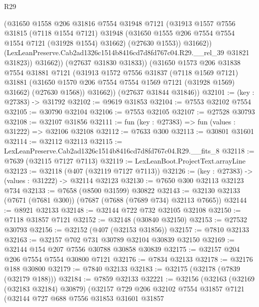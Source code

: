 \begin{lexlean}{R29}
\begin{coremodule}
                  (@31650
                    @1558
                    @206
                    @31816
                    @7554
                    @31948
                    @7121
                    (@31913
                      @1557
                      @7556
                      @31815
                      (@7118 @1554 @7121)
                      @31948
                      (@31650 @1555 @206 @7554 @7554 @1554 @7121 (@31928 @1554) @31662)
                      (@27630 @1553))
                    @31662))
                (LexLeanPreserve.Cab2ad1326c1514b8416cd7d8fd767c04.R29.__rel_39 @31821 @31823))
              @31662))
          (@27637 @31830 @31833))
        (@31650
          @1573
          @206
          @31838
          @7554
          @31881
          @7121
          (@31913
            @1572
            @7556
            @31837
            (@7118 @1569 @7121)
            @31881
            (@31650 @1570 @206 @7554 @7554 @1569 @7121 (@31928 @1569) @31662)
            (@27630 @1568))
          @31662))
      (@27637 @31844 @31846))
@32101 := (key : @27383) -> @31792
@32102 := @9619 @31853
@32104 := @7553 @32102 @7554
@32105 := @30790 @32104
@32106 := @7553 @32105
@32107 := @27528 @30793
@32108 := @32107 @31856
@32111 := fun (key : @27383) => fun (values : @31222) => @32106 @32108
@32112 := @7633 @300
@32113 := @30801 @31601
@32114 := @32112 @32113
@32115 := LexLeanPreserve.Cab2ad1326c1514b8416cd7d8fd767c04.R29.__fits_8
@32118 := @7639 (@32115 @7127 @7113)
@32119 := LexLeanBoot.ProjectText.arrayLine
@32123 := @32118 (@407 (@32119 @7127 @7113))
@32126 := (key : @27383) -> (values : @31222) -> @32114 @32123
@32130 := @7650 @300 @32113 @32123 @734
@32133 := @7658 (@8500 @31599) @30822
@32143 := @32130 @32133 (@7671 (@7681 @300)) (@7687 (@7688 (@7689 @734) @32113 @7665))
@32144 := @8921 @32133
@32148 := @32144 @722 @732 @32105 @32108
@32150 := @7118 @31857 @7121
@32152 := @32148 (@30840 @32150)
@32153 := @27532 @30793
@32156 := @32152 (@407 (@32153 @31856))
@32157 := @7810 @32133
@32163 := @32157 @702 @731 @30789 @32104 @30839 @32150
@32169 := @32144 @154 @207 @7556 @30788 @30858 @30839
@32175 := @32157 @204 @206 @7554 @7554 @30800 @7121
@32176 := @7834 @32133
@32178 := @32176 @188 @30800
@32179 := @7840 @32133
@32183 := @32175 (@32178 (@7839 (@32179 @188)))
@32184 := @7859 @32133
@32221 := @32156
    (@32163
      (@32169 (@32183 @32184) @30879)
      (@32157
        @729
        @206
        @32102
        @7554
        @31857
        @7121
        (@32144
          @727
          @688
          @7556
          @31853
          @31601
          @31857

\end{coremodule}
\end{lexlean}
